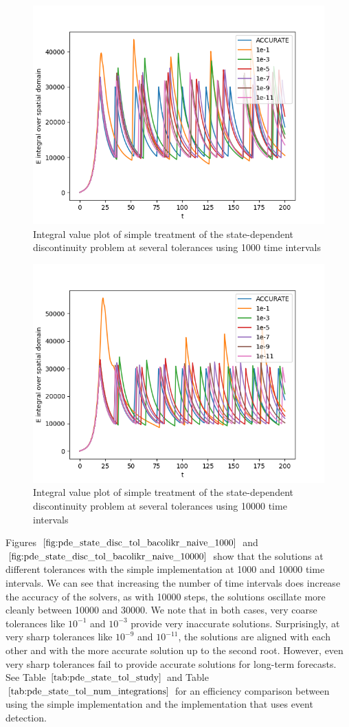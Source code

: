 \documentclass{article}
\begin{document}
\begin{figure}[H]
\centering
\includegraphics[width=0.7\linewidth]{./figures/pde_state_disc_tol_bacolikr_naive_1000}
\caption{Integral value plot of simple treatment of the state-dependent discontinuity problem at several tolerances using 1000 time intervals}
\label{fig:pde_state_disc_tol_bacolikr_naive_1000}
\end{figure}

\begin{figure}[H]
\centering
\includegraphics[width=0.7\linewidth]{./figures/pde_state_disc_tol_bacolikr_naive_10000}
\caption{Integral value plot of simple treatment of the state-dependent discontinuity problem at several tolerances using 10000 time intervals}
\label{fig:pde_state_disc_tol_bacolikr_naive_10000}
\end{figure}

Figures $\ref{fig:pde_state_disc_tol_bacolikr_naive_1000}$ and $\ref{fig:pde_state_disc_tol_bacolikr_naive_10000}$ show that the solutions at different tolerances with the simple implementation at 1000 and 10000 time intervals. We can see that increasing the number of time intervals does increase the accuracy of the solvers, as with 10000 steps, the solutions oscillate more cleanly between 10000 and 30000. We note that in both cases, very coarse tolerances like $10^{-1}$ and $10^{-3}$ provide very inaccurate solutions. Surprisingly, at very sharp tolerances like $10^{-9}$ and $10^{-11}$, the solutions are aligned with each other and with the more accurate solution up to the second root. However, even very sharp tolerances fail to provide accurate solutions for long-term forecasts. See Table $\ref{tab:pde_state_tol_study}$ and Table $\ref{tab:pde_state_tol_num_integrations}$ for an efficiency comparison between using the simple implementation and the implementation that uses event detection. 
\end{document}
